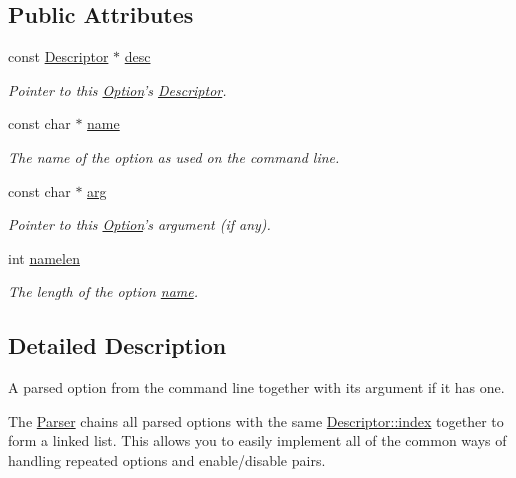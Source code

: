 \subsection*{Public Attributes}
\begin{DoxyCompactItemize}
\item 
const \hyperlink{struct_option_parser_1_1_descriptor}{Descriptor} $\ast$ \hyperlink{class_option_parser_1_1_option_a9ea2f4b0658ab175b7f0f0c204671fa9}{desc}
\begin{DoxyCompactList}\small\item\em Pointer to this \hyperlink{class_option_parser_1_1_option}{Option}'s \hyperlink{struct_option_parser_1_1_descriptor}{Descriptor}. \end{DoxyCompactList}\item 
const char $\ast$ \hyperlink{class_option_parser_1_1_option_abea386c9b8b1a810a2eb776d338fdfab}{name}
\begin{DoxyCompactList}\small\item\em The name of the option as used on the command line. \end{DoxyCompactList}\item 
const char $\ast$ \hyperlink{class_option_parser_1_1_option_a5b222bff75241e025502aab20a914191}{arg}
\begin{DoxyCompactList}\small\item\em Pointer to this \hyperlink{class_option_parser_1_1_option}{Option}'s argument (if any). \end{DoxyCompactList}\item 
int \hyperlink{class_option_parser_1_1_option_a25a2b22da7c974be3bcda66f08d2f3f3}{namelen}
\begin{DoxyCompactList}\small\item\em The length of the option \hyperlink{class_option_parser_1_1_option_abea386c9b8b1a810a2eb776d338fdfab}{name}. \end{DoxyCompactList}\end{DoxyCompactItemize}


\subsection{Detailed Description}
A parsed option from the command line together with its argument if it has one. 

The \hyperlink{class_option_parser_1_1_parser}{Parser} chains all parsed options with the same \hyperlink{struct_option_parser_1_1_descriptor_ae62860781844b44c0bd4f730c96701d7}{Descriptor\-::index} together to form a linked list. This allows you to easily implement all of the common ways of handling repeated options and enable/disable pairs.

